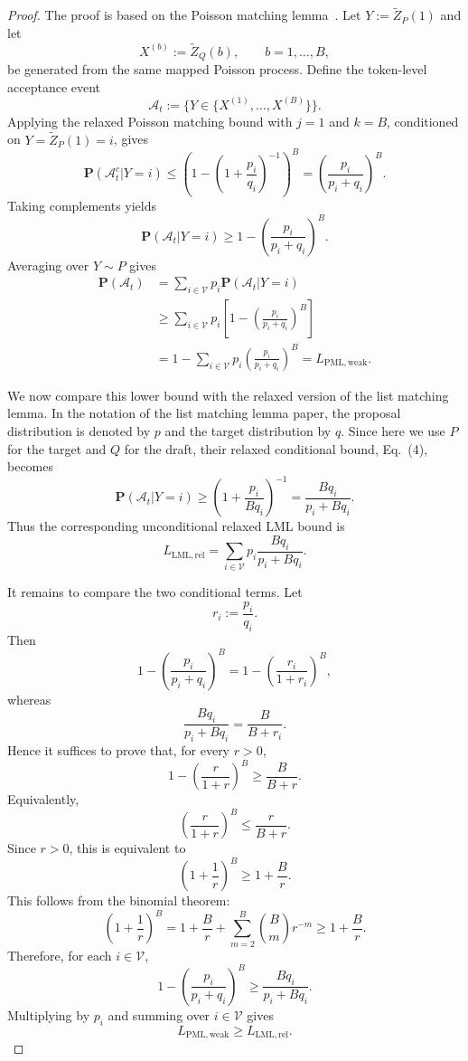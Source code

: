 \documentclass{article}
\theoremstyle{plain}
\theoremstyle{definition}
\begin{document}
\begin{proof}
The proof is based on the Poisson matching lemma~\citep{li2021unified}.
Let $Y:=\tilde Z_P(1)$ and let
\[
    X^{(b)}:=\tilde Z_Q(b),\qquad b=1,\ldots,B,
\]
be generated from the same mapped Poisson process. Define the token-level
acceptance event
\[
    \mathcal A_t
    :=
    \Big\{
        Y\in\{X^{(1)},\ldots,X^{(B)}\}
    \Big\}.
\]
Applying the relaxed Poisson matching bound with $j=1$ and $k=B$, conditioned
on $Y=\tilde Z_P(1)=i$, gives
\[
    \mathbf{P}(\mathcal A_t^c| Y=i)
    \le
    \left(
        1-\left(1+\frac{p_i}{q_i}\right)^{-1}
    \right)^B
    =
    \left(
        \frac{p_i}{p_i+q_i}
    \right)^B .
\]
Taking complements yields
\[
    \mathbf{P}(\mathcal A_t| Y=i)
    \ge
    1-
    \left(
        \frac{p_i}{p_i+q_i}
    \right)^B .
\]
Averaging over $Y\sim P$ gives
\[
\begin{aligned}
    \mathbf{P}(\mathcal A_t)
    &=
    \sum_{i\in\mathcal V}
    p_i\mathbf{P}(\mathcal A_t| Y=i)\\
    &\ge
    \sum_{i\in\mathcal V}
    p_i
    \left[
        1-
        \left(
            \frac{p_i}{p_i+q_i}
        \right)^B
    \right]\\
    &=
    1-\sum_{i\in\mathcal V}
    p_i
    \left(
        \frac{p_i}{p_i+q_i}
    \right)^B
    =
    L_{\mathrm{PML,weak}}.
\end{aligned}
\]

We now compare this lower bound with the relaxed version of the list matching
lemma. In the notation of the list matching lemma paper, the proposal
distribution is denoted by $p$ and the target distribution by $q$. Since here
we use $P$ for the target and $Q$ for the draft, their relaxed conditional
bound, Eq.~(4), becomes
\[
    \mathbf{P}(\mathcal A_t| Y=i)
    \ge
    \left(
        1+\frac{p_i}{Bq_i}
    \right)^{-1}
    =
    \frac{Bq_i}{p_i+Bq_i}.
\]
Thus the corresponding unconditional relaxed LML bound is
\[
    L_{\mathrm{LML,rel}}
    =
    \sum_{i\in\mathcal V}
    p_i
    \frac{Bq_i}{p_i+Bq_i}.
\]

It remains to compare the two conditional terms. Let
\[
    r_i:=\frac{p_i}{q_i}.
\]
Then
\[
    1-
    \left(
        \frac{p_i}{p_i+q_i}
    \right)^B
    =
    1-
    \left(
        \frac{r_i}{1+r_i}
    \right)^B,
\]
whereas
\[
    \frac{Bq_i}{p_i+Bq_i}
    =
    \frac{B}{B+r_i}.
\]
Hence it suffices to prove that, for every $r>0$,
\[
    1-
    \left(
        \frac{r}{1+r}
    \right)^B
    \ge
    \frac{B}{B+r}.
\]
Equivalently,
\[
    \left(
        \frac{r}{1+r}
    \right)^B
    \le
    \frac{r}{B+r}.
\]
Since $r>0$, this is equivalent to
\[
    \left(
        1+\frac{1}{r}
    \right)^B
    \ge
    1+\frac{B}{r}.
\]
This follows from the binomial theorem:
\[
    \left(
        1+\frac{1}{r}
    \right)^B
    =
    1+\frac{B}{r}
    +
    \sum_{m=2}^B
    \binom{B}{m}r^{-m}
    \ge
    1+\frac{B}{r}.
\]
Therefore, for each $i\in\mathcal V$,
\[
    1-
    \left(
        \frac{p_i}{p_i+q_i}
    \right)^B
    \ge
    \frac{Bq_i}{p_i+Bq_i}.
\]
Multiplying by $p_i$ and summing over $i\in\mathcal V$ gives
\[
    L_{\mathrm{PML,weak}}
    \ge
    L_{\mathrm{LML,rel}}.
\]


\end{proof}
\end{document}
